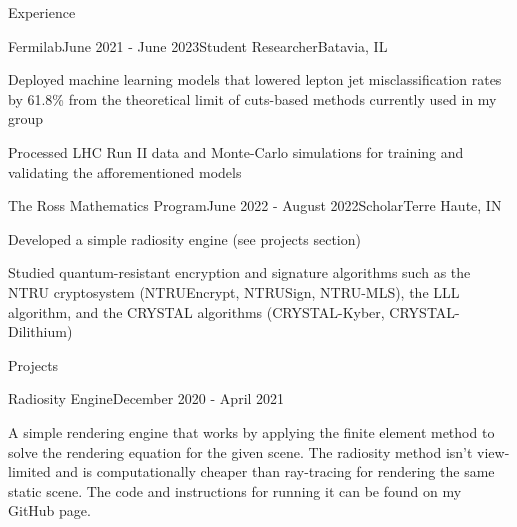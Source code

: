 \documentclass[
	11pt, %
]{resume} %
\begin{document}
\begin{rSection}{Experience}

	\begin{rSubsection}{Fermilab}{June 2021 - June 2023}{Student Researcher}{Batavia, IL}
		\item Deployed machine learning models that lowered lepton jet misclassification rates by 61.8\% from the theoretical limit of cuts-based methods currently used in my group
        \item Processed LHC Run II data and Monte-Carlo simulations for training and validating the afforementioned models
	\end{rSubsection}

    \begin{rSubsection}{The Ross Mathematics Program}{June 2022 - August 2022}{Scholar}{Terre Haute, IN}
        \item Developed a simple radiosity engine (see projects section)
        \item Studied quantum-resistant encryption and signature algorithms such as the NTRU cryptosystem (NTRUEncrypt, NTRUSign, NTRU-MLS), the LLL algorithm, and the CRYSTAL algorithms (CRYSTAL-Kyber, CRYSTAL-Dilithium)
        
    \end{rSubsection}


\end{rSection}

\begin{rSection}{Projects}

    \begin{rSubsection}{Radiosity Engine}{December 2020 - April 2021}{}{}
		\item A simple rendering engine that works by applying the finite element method to solve the rendering equation for the given scene. The radiosity method isn't view-limited and is computationally cheaper than ray-tracing for rendering the same static scene. The code and instructions for running it can be found on my GitHub page.
	\end{rSubsection}
\end{rSection}

\end{document}
